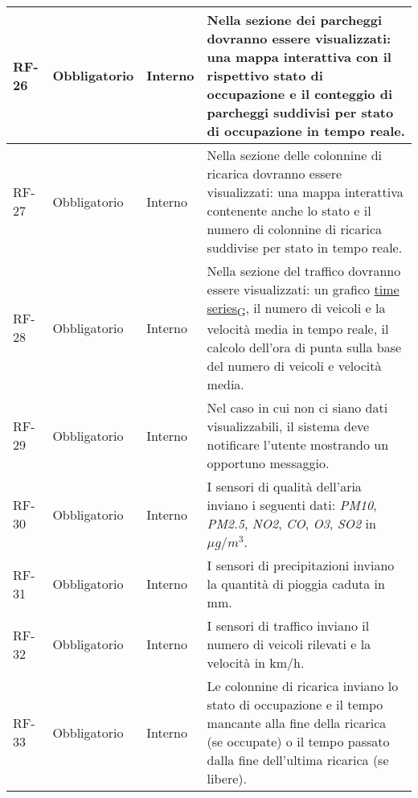 \begin{longtable}{|>{\centering\arraybackslash}m{}|>{\centering\arraybackslash}m{}|>{\centering\arraybackslash}m{}|>{\centering\arraybackslash}m{}|}
	RF-26           & Obbligatorio        & Interno                                                                                                           & Nella sezione dei parcheggi dovranno essere visualizzati: una mappa interattiva con il rispettivo stato di occupazione e il conteggio di parcheggi suddivisi per stato di occupazione in tempo reale.
	\\\hline
	RF-27           & Obbligatorio        & Interno                                                                                                           & Nella sezione delle colonnine di ricarica dovranno essere visualizzati: una mappa interattiva contenente anche lo stato e il numero di colonnine di ricarica suddivise per stato in tempo reale.
	\\\hline
	RF-28           & Obbligatorio        & Interno                                                                                                           & Nella sezione del traffico dovranno essere visualizzati: un grafico \href{https://7last.github.io/docs/pb/documentazione-interna/glossario\#time-series}{time series\textsubscript{G}}, il numero di veicoli e la velocità media in tempo reale, il calcolo dell'ora di punta sulla base del numero di veicoli e velocità media.
	\\\hline
	RF-29           & Obbligatorio        & Interno                                                                                                           & Nel caso in cui non ci siano dati visualizzabili, il sistema deve notificare l'utente mostrando un opportuno messaggio.
	\\\hline
	RF-30           & Obbligatorio        & Interno                                                                                                           & I sensori di qualità dell'aria inviano i seguenti dati: \textit{PM10}, \textit{PM2.5}, \textit{NO2}, \textit{CO}, \textit{O3}, \textit{SO2} in $\mu g/m^3$.
	\\\hline
	RF-31           & Obbligatorio        & Interno                                                                                                           & I sensori di precipitazioni inviano la quantità di pioggia caduta in mm.
	\\\hline
	RF-32           & Obbligatorio        & Interno                                                                                                           & I sensori di traffico inviano il numero di veicoli rilevati e la velocità in km/h.
	\\\hline
	RF-33           & Obbligatorio        & Interno                                                                                                           & Le colonnine di ricarica inviano lo stato di occupazione e il tempo mancante alla fine della ricarica (se occupate) o il tempo passato dalla fine dell'ultima ricarica (se libere).

\end{longtable}

